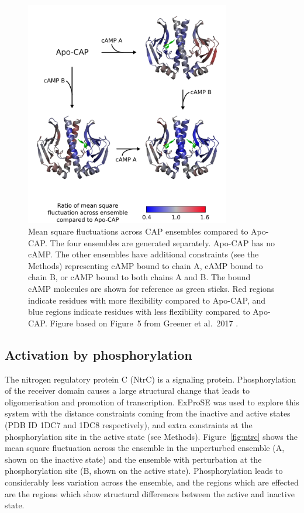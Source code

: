\begin{figure}
\centering

\includegraphics[width=0.8\textwidth]{figures/cap/cap}

\caption[Mean square fluctuations across perturbed CAP ensembles compared to Apo-CAP]
{Mean square fluctuations across CAP ensembles compared to Apo-CAP.
The four ensembles are generated separately.
Apo-CAP has no cAMP.
The other ensembles have additional constraints (see the Methods) representing cAMP bound to chain A, cAMP bound to chain B, or cAMP bound to both chains A and B.
The bound cAMP molecules are shown for reference as green sticks.
Red regions indicate residues with more flexibility compared to Apo-CAP, and blue regions indicate residues with less flexibility compared to Apo-CAP.
Figure based on Figure~5 from Greener et al.\ 2017 \cite{Greener2017}.}

\label{fig:cap}
\end{figure}


\subsection{Activation by phosphorylation}

The nitrogen regulatory protein C (NtrC) is a signaling protein.
Phosphorylation of the receiver domain causes a large structural change \cite{Kern1999} that leads to oligomerisation and promotion of transcription.
ExProSE was used to explore this system with the distance constraints coming from the inactive and active states (PDB ID 1DC7 and 1DC8 respectively), and extra constraints at the phosphorylation site in the active state (see Methods).
Figure~\ref{fig:ntrc} shows the mean square fluctuation across the ensemble in the unperturbed ensemble (A, shown on the inactive state) and the ensemble with perturbation at the phosphorylation site (B, shown on the active state).
Phosphorylation leads to considerably less variation across the ensemble, and the regions which are effected are the regions which show structural differences between the active and inactive state.

